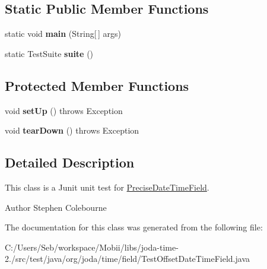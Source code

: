 \subsection*{Static Public Member Functions}
\begin{DoxyCompactItemize}
\item 
\hypertarget{classorg_1_1joda_1_1time_1_1field_1_1_test_offset_date_time_field_af580c5e6fe0d9544633dd351b4e6d5b2}{static void {\bfseries main} (String\mbox{[}$\,$\mbox{]} args)}\label{classorg_1_1joda_1_1time_1_1field_1_1_test_offset_date_time_field_af580c5e6fe0d9544633dd351b4e6d5b2}

\item 
\hypertarget{classorg_1_1joda_1_1time_1_1field_1_1_test_offset_date_time_field_ab6d338f2889f42c7e23c563f7d31ad54}{static Test\-Suite {\bfseries suite} ()}\label{classorg_1_1joda_1_1time_1_1field_1_1_test_offset_date_time_field_ab6d338f2889f42c7e23c563f7d31ad54}

\end{DoxyCompactItemize}
\subsection*{Protected Member Functions}
\begin{DoxyCompactItemize}
\item 
\hypertarget{classorg_1_1joda_1_1time_1_1field_1_1_test_offset_date_time_field_a281251c1746850c7959d885d253e45a2}{void {\bfseries set\-Up} ()  throws Exception }\label{classorg_1_1joda_1_1time_1_1field_1_1_test_offset_date_time_field_a281251c1746850c7959d885d253e45a2}

\item 
\hypertarget{classorg_1_1joda_1_1time_1_1field_1_1_test_offset_date_time_field_a8808778b20fdd448fe523fef79d32fcb}{void {\bfseries tear\-Down} ()  throws Exception }\label{classorg_1_1joda_1_1time_1_1field_1_1_test_offset_date_time_field_a8808778b20fdd448fe523fef79d32fcb}

\end{DoxyCompactItemize}


\subsection{Detailed Description}
This class is a Junit unit test for \hyperlink{classorg_1_1joda_1_1time_1_1field_1_1_precise_date_time_field}{Precise\-Date\-Time\-Field}.

\begin{DoxyAuthor}{Author}
Stephen Colebourne 
\end{DoxyAuthor}


The documentation for this class was generated from the following file\-:\begin{DoxyCompactItemize}
\item 
C\-:/\-Users/\-Seb/workspace/\-Mobii/libs/joda-\/time-\/2./src/test/java/org/joda/time/field/Test\-Offset\-Date\-Time\-Field.\-java\end{DoxyCompactItemize}

